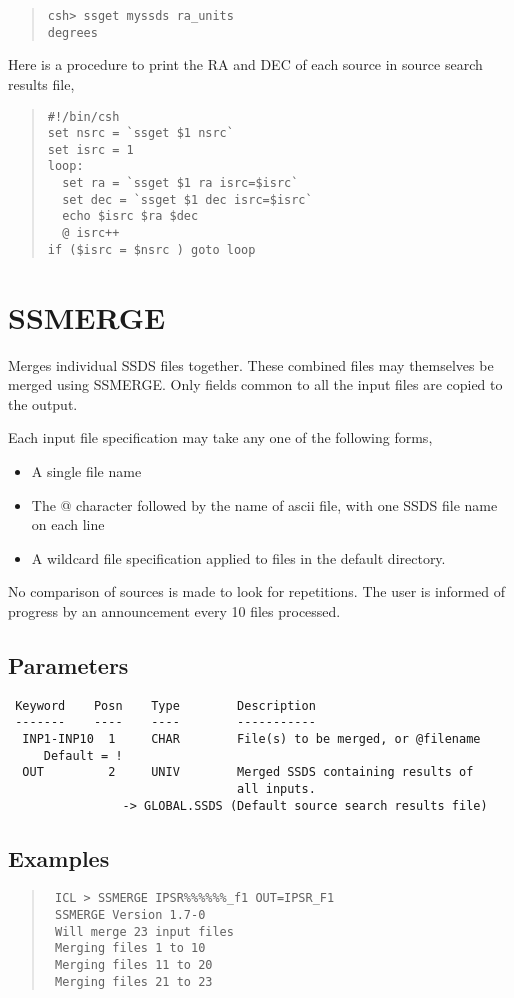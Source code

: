 \documentclass{book}
\renewcommand{\_}{{\tt\char'137}}     %
\begin{document}
\begin{quote}\begin{verbatim}
csh> ssget myssds ra_units
degrees
\end{verbatim}\end{quote}
Here is a procedure to print the RA and DEC of each source in source
search results file,

\begin{quote}\begin{verbatim}
#!/bin/csh
set nsrc = `ssget $1 nsrc`
set isrc = 1
loop:
  set ra = `ssget $1 ra isrc=$isrc`
  set dec = `ssget $1 dec isrc=$isrc`
  echo $isrc $ra $dec
  @ isrc++
if ($isrc = $nsrc ) goto loop
\end{verbatim}\end{quote}
\section{SSMERGE}
Merges individual SSDS files together. These combined files may
themselves be merged using SSMERGE. Only fields common to all
the input files are copied to the output.

Each input file specification may take any one of the following
forms,
\begin{itemize}
\item A single file name
\item The @ character followed by the name of ascii file, with
one SSDS file name on each line
\item A wildcard file specification applied to files in the
default directory.
\end{itemize}
No comparison of sources is made to look for repetitions. The
user is informed of progress by an announcement every 10 files
processed.

\subsection{Parameters}
\begin{verbatim}
 Keyword    Posn    Type        Description
 -------    ----    ----        -----------
  INP1-INP10  1     CHAR        File(s) to be merged, or @filename
     Default = !
  OUT         2     UNIV        Merged SSDS containing results of
                                all inputs.
                -> GLOBAL.SSDS (Default source search results file)

\end{verbatim}\subsection{Examples}
\begin{quote}\begin{verbatim}
 ICL > SSMERGE IPSR%%%%%%_f1 OUT=IPSR_F1
 SSMERGE Version 1.7-0
 Will merge 23 input files
 Merging files 1 to 10
 Merging files 11 to 20
 Merging files 21 to 23
 \end{verbatim}\end{quote}
\end{document}
